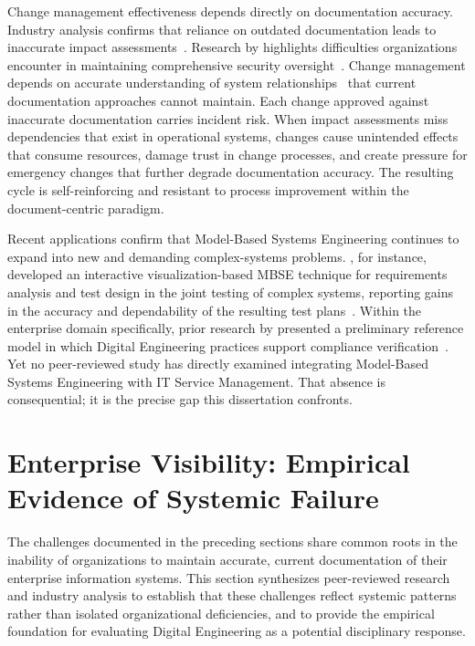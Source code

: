 Change management effectiveness depends directly on documentation accuracy. Industry analysis confirms that reliance on outdated documentation leads to inaccurate impact assessments~\parencite{Freshservice_Change_2021}. Research by \citeauthor{Bokan_Santos_2021} highlights difficulties organizations encounter in maintaining comprehensive security oversight~\parencite{Bokan_Santos_2021}. Change management depends on accurate understanding of system relationships~\parencite{iso20000_2018} that current documentation approaches cannot maintain. Each change approved against inaccurate documentation carries incident risk. When impact assessments miss dependencies that exist in operational systems, changes cause unintended effects that consume resources, damage trust in change processes, and create pressure for emergency changes that further degrade documentation accuracy. The resulting cycle is self-reinforcing and resistant to process improvement within the document-centric paradigm.

Recent applications confirm that Model-Based Systems Engineering continues to expand into new and demanding complex-systems problems. \citeauthor{SUN2025100231}, for instance, developed an interactive visualization-based MBSE technique for requirements analysis and test design in the joint testing of complex systems, reporting gains in the accuracy and dependability of the resulting test plans~\parencite{SUN2025100231}. Within the enterprise domain specifically, prior research by \citeauthor{Bonar_Hastings_2024} presented a preliminary reference model in which Digital Engineering practices support compliance verification~\parencite{Bonar_Hastings_2024}. Yet no peer-reviewed study has directly examined integrating Model-Based Systems Engineering with IT Service Management. That absence is consequential; it is the precise gap this dissertation confronts.

\section{Enterprise Visibility: Empirical Evidence of Systemic Failure}\label{sec:enterprise_visibility}

The challenges documented in the preceding sections share common roots in the inability of organizations to maintain accurate, current documentation of their enterprise information systems. This section synthesizes peer-reviewed research and industry analysis to establish that these challenges reflect systemic patterns rather than isolated organizational deficiencies, and to provide the empirical foundation for evaluating Digital Engineering as a potential disciplinary response.

